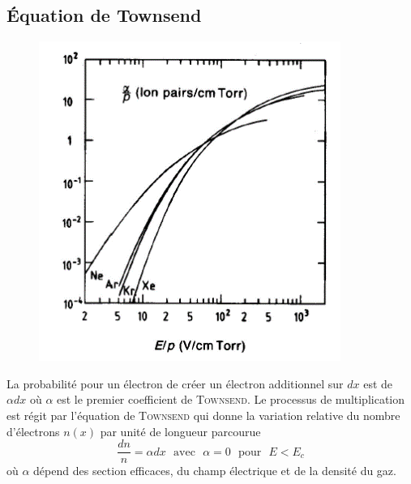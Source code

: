 \subsection{Équation de Townsend}%

	\begin{figure}
	\vspace{-5mm}
	\includegraphics[scale=0.35]{ch8/image9}
	\end{figure}
La probabilité pour un électron de créer un électron additionnel sur $dx$ est de $\alpha dx$ où
$\alpha$ est le premier coefficient de \textsc{Townsend}. Le processus de multiplication est
régit par l'équation de \textsc{Townsend} qui donne la variation relative du nombre d'électrons
$n(x)$ par unité de longueur parcourue
\begin{equation}
\frac{dn}{n}=\alpha dx {\mbox{~~avec~~}}\alpha=0  {\mbox{~~pour~~}}E<E_c
\end{equation}
où $\alpha$ dépend des section efficaces, du champ électrique et de la densité du gaz.



